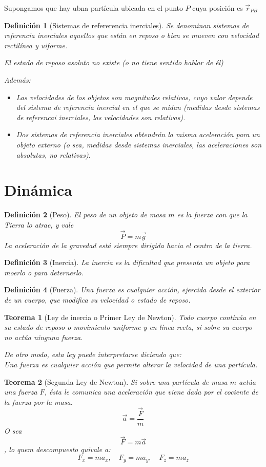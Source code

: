 \documentclass[12pt,a4paper]{article}
\newtheorem{mydef}{Definici\'on}[section]
\newtheorem{theorem}{Teorema}[section]
\begin{document}
Supongamos que hay ubna partícula ubicada en el punto \(P\) cuya
posición es \(\vec{r}_{PB}\)

\begin{mydef}[Sistemas de refererencia inerciales]
Se denominan \emph{sistemas de referencia inerciales} aquellos que
est\'an en reposo o bien se mueven con velocidad rectil\'inea y
uiforme.

El estado de reposo asoluto no existe (o no tiene sentido hablar de
\'el)

Adem\'as: 
\begin{itemize}
\item Las velocidades de los objetos son magnitudes relativas, cuyo
  valor depende del sistema de referencia inercial en el que se midan
  (medidas desde sistemas de referencai inerciales, las velocidades
  son relativas).
\item Dos sistemas de referencia inerciales obtendr\'an la misma
  aceleraci\'on para un objeto externo (o sea, medidas desde sistemas
  inerciales, las aceleraciones son absolutas, no relativas).
\end{itemize}
\end{mydef}

\section{Din\'amica}
\begin{mydef}[Peso]
El peso de un objeto de masa \(m\) es la fuerza con que la Tierra lo
atrae, y vale \[\vec{P} = m\vec{g}\]
 La aceleraci\'on de la gravedad est\'a siempre dirigida hacia el
 centro de la tierra.
\end{mydef}
\begin{mydef}[Inercia]
La inercia es la dificultad que presenta un objeto para moerlo o para
deternerlo.
\end{mydef}
\begin{mydef}[Fuerza]
Una fuerza es cualquier acci\'on, ejercida desde el exterior de un
cuerpo, que modifica su velocidad o estado de reposo.
\end{mydef}
\begin{theorem}
[Ley de inercia o Primer Ley de Newton]
Todo cuerpo contin\'ua en su estado de reposo o movimiento uniforme y
en l\'inea recta, si sobre su cuerpo no act\'ua ninguna fuerza.

De otro modo, esta ley puede interpretarse diciendo que:\\
Una fuerza es cualquier acci\'on que permite alterar la velocidad de
una part\'icula.
\end{theorem}
\begin{theorem}[Segunda Ley de Newton]
Si sobre una part\'icula de masa \(m\) act\'ua una fuerza \(F\),
\'esta le comunica una aceleraci\'on que viene dada por el cociente de
la fuerza por la masa.
\[\vec{a}=\frac{\vec{F}}{m}\]
O sea \[\vec{F}=m\vec{a}\], lo quem descompuesto quivale a:
\[F_x=ma_x,\quad  F_y=ma_y, \quad F_z=ma_z\]
\end{theorem}
\end{document}
